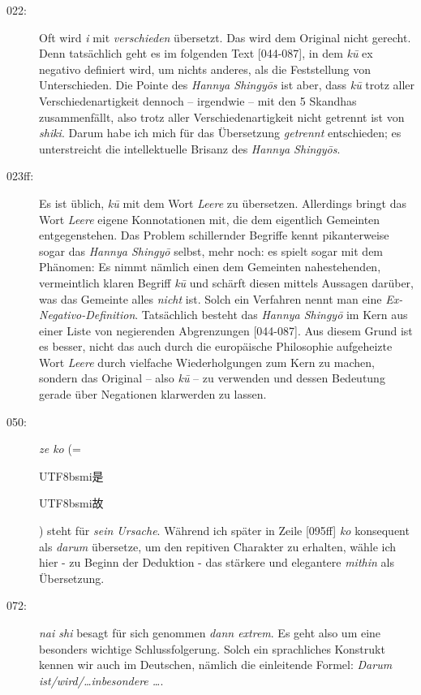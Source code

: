 \documentclass[
DIV=calc,
BCOR=5mm,
11pt,
headings=small,
oneside,
bibtotocnumbered,
english,ngerman]{scrartcl}
\newcommand{\cnbsmi}[1]{\begin{CJK}{UTF8}{bsmi}#1\end{CJK}}
\begin{document}
\begin{description}
  \item[022:] Oft wird \emph{i} mit \emph{verschieden} übersetzt. Das wird dem
  Original nicht gerecht. Denn tatsächlich geht es im folgenden Text [044-087],
  in dem \emph{kū} ex negativo definiert wird, um nichts anderes, als die
  Feststellung von Unterschieden. Die Pointe des \emph{Hannya Shingyōs} ist
  aber, dass \emph{kū} trotz aller Verschiedenartigkeit dennoch -- irgendwie --
  mit den 5 Skandhas zusammenfällt, also trotz aller Verschiedenartigkeit nicht
  getrennt ist von \emph{shiki}. Darum habe ich mich für das Übersetzung
  \emph{getrennt} entschieden; es unterstreicht die intellektuelle Brisanz des
  \emph{Hannya Shingyōs}.

  \item[023ff:] Es ist üblich, \emph{kū} mit dem Wort \emph{Leere} zu
  übersetzen. Allerdings bringt das Wort \emph{Leere} eigene Konnotationen mit,
  die dem eigentlich Gemeinten entgegenstehen. Das Problem schillernder Begriffe
  kennt pikanterweise sogar das \emph{Hannya Shingyō} selbst, mehr noch: es
  spielt sogar mit dem Phänomen: Es nimmt nämlich einen dem Gemeinten
  nahestehenden, vermeintlich klaren Begriff \emph{kū} und schärft diesen
  mittels Aussagen darüber, was das Gemeinte alles \emph{nicht} ist. Solch ein
  Verfahren nennt man eine \emph{Ex-Negativo-Definition}. Tatsächlich besteht
  das \emph{Hannya Shingyō} im Kern aus einer Liste von negierenden Abgrenzungen
  [044-087]. Aus diesem Grund ist es besser, nicht das auch durch die
  europäische Philosophie aufgeheizte Wort \emph{Leere} durch vielfache
  Wiederholgungen zum Kern zu machen, sondern das Original -- also \emph{kū} -- 
  zu verwenden und dessen Bedeutung gerade über Negationen klarwerden zu lassen.

  \item[050:] \emph{ze ko} (= \cnbsmi{是} \cnbsmi{故}) steht für \emph{sein
  Ursache}. Während ich später in Zeile [095ff] \emph{ko} konsequent als
  \emph{darum} übersetze, um den repitiven Charakter zu erhalten, wähle ich hier
  - zu Beginn der Deduktion - das stärkere und elegantere \emph{mithin} als
  Übersetzung.
  \item[072:] \emph{nai shi} besagt für sich genommen \emph{dann extrem}. Es
  geht also um eine besonders wichtige Schlussfolgerung. Solch ein sprachliches
  Konstrukt kennen wir auch im Deutschen, nämlich die einleitende Formel:
  \emph{Darum ist/wird/\ldots inbesondere \ldots}.


\end{description}
\end{document}
